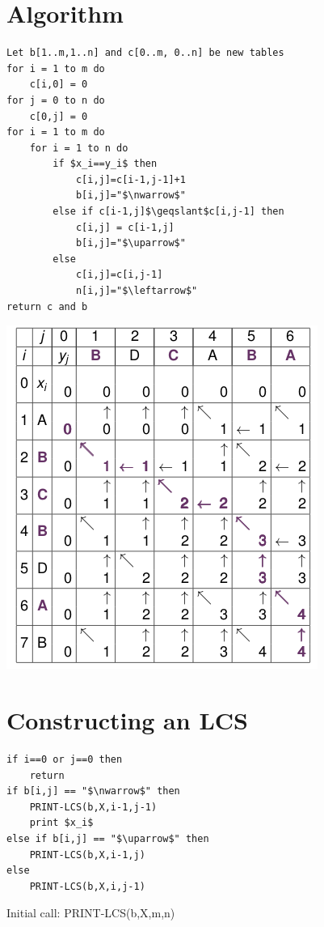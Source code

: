 \documentclass{article}[18pt]
\begin{document}
\section{Algorithm}
\begin{lstlisting}[caption=LCS({X,Y})]
Let b[1..m,1..n] and c[0..m, 0..n] be new tables
for i = 1 to m do
	c[i,0] = 0
for j = 0 to n do
	c[0,j] = 0
for i = 1 to m do
	for i = 1 to n do
		if $x_i==y_i$ then
			c[i,j]=c[i-1,j-1]+1
			b[i,j]="$\nwarrow$"
		else if c[i-1,j]$\geqslant$c[i,j-1] then
			c[i,j] = c[i-1,j]
			b[i,j]="$\uparrow$"
		else
			c[i,j]=c[i,j-1]
			n[i,j]="$\leftarrow$"
return c and b
\end{lstlisting}
\begin{center}
	\includegraphics[scale=0.7]{algorithm}
\end{center}
\newpage
\section{Constructing an LCS}
\begin{lstlisting}[caption=PRINT-LCS({b,X,i,j})]
if i==0 or j==0 then
	return
if b[i,j] == "$\nwarrow$" then
	PRINT-LCS(b,X,i-1,j-1)
	print $x_i$
else if b[i,j] == "$\uparrow$" then
	PRINT-LCS(b,X,i-1,j)
else
	PRINT-LCS(b,X,i,j-1)
\end{lstlisting}
Initial call: PRINT-LCS(b,X,m,n)
\end{document}

